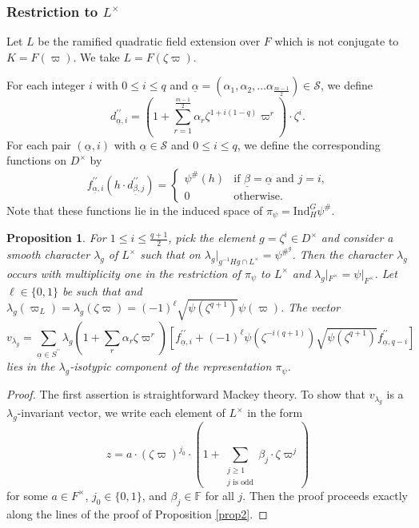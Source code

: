 \documentclass[12pt]{amsart}
\newtheorem{proposition}[theorem]{Proposition}
\theoremstyle{definition}
\theoremstyle{remark}
\begin{document}
\subsubsection{Restriction to $L^\times$}

Let $L$ be the ramified quadratic field extension over $F$ which is not conjugate to $K = F(\varpi)$. We take $L = F(\zeta \varpi)$. 

For each integer $i$ with $0 \leq i \leq q$ and $\underline{\alpha}=(\alpha_1, \alpha_2, \dots \alpha_{\frac{m-1}{2}}) \in \mathcal{S}$, we define
\[d_{\underline{\alpha}, i}^{\prime\prime} = (1 + \sum\limits_{r=1}^{\frac{m-1}{2}} \alpha_r \zeta^{1+i(1-q)} \varpi^r) \cdot \zeta^i.\] 
For each pair $(\underline{\alpha},i)$ with $\underline{\alpha} \in \mathcal{S}$ and $0 \leq i \leq q$, we define the corresponding functions on $D^\times$ by 
\[f^{\prime\prime}_{\underline{\alpha}, i}(h \cdot d^{\prime\prime}_{\underline{\beta}, j}) = \begin{cases}
\psi^\#(h) &\text{if $\underline{\beta} = \underline{\alpha}$ and $j = i$,} \\
0 &\text{otherwise.}
\end{cases} \]
Note that these functions lie in the induced space of $\pi_\psi = \mathrm{Ind}^G_{H} \psi^\#$.

\begin{proposition}\label{prop3}
For $1 \leq i \leq \frac{q+1}{2}$, pick the element $g = \zeta^i \in D^\times$ and consider a smooth character $\lambda_g$ of $L^\times$ such that on $\lambda_g|_{g^{-1}Hg \cap L^\times} = \psi^{{\#}^g}$. Then the character $\lambda_g$ occurs with multiplicity one in the restriction of $\pi_\psi$ to $L^\times$ and $\lambda_g|_{F^\times} = \psi|_{F^\times}$. Let $\ell \in \{0,1\}$ be such that  and $\lambda_g(\varpi_L) = \lambda_g(\zeta \varpi) = (-1)^\ell \sqrt{\psi(\zeta^{q+1})} \psi(\varpi)$. The vector 
\[v_{\lambda_g} = \sum\limits_{\underline{\alpha} \in S^{\prime \prime} } \lambda_g(1 + \sum\limits_{r} \alpha_r \zeta \varpi^r) \left[ f_{\underline{\alpha}, i}^{\prime\prime} + (-1)^\ell  
\psi(\zeta^{-i(q+1)})\sqrt{\psi(\zeta^{q+1})}
f_{\underline{\alpha}, q-i}^{\prime \prime} \right]\]
lies in the $\lambda_g$-isotypic component of the representation $\pi_\psi$.
\end{proposition}

\begin{proof}
The first assertion is straightforward Mackey theory. To show that $v_{\lambda_g}$ is a $\lambda_g$-invariant vector, we write each element of $L^\times$ in the form 
\[z= a \cdot (\zeta \varpi)^{j_0} \cdot (1 + \sum\limits_{\substack{j \geq 1  \\    j \text{ is odd} }}\beta_j \cdot  \zeta \varpi^j )\]
for some $a \in F^\times$, $j_0 \in \{0,1\}$, and $\beta_j \in \mathbb F$ for all $j$. Then the proof proceeds exactly along the lines of the proof of Proposition \ref{prop2}. 	
\end{proof}	
\end{document}
